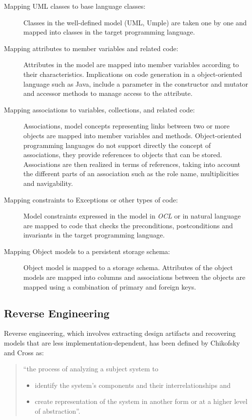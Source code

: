 \begin{description}

\item [Mapping UML classes to base language classes:]
Classes in the well-defined model (UML, Umple) are taken one by one and mapped into classes in the target programming language. 

\item [Mapping attributes to member variables and related code:]
Attributes in the model are mapped into member variables according to their characteristics. Implications on code generation in a object-oriented language such as Java, include a parameter in the constructor and mutator and accessor methods to manage access to the attribute.

\item [Mapping associations to variables, collections, and related code:]
Associations, model concepts representing links between two or more objects are mapped into member variables and methods. Object-oriented programming languages do not support directly the concept of associations, they provide references to objects that can be stored. Associations are then realized in terms of references, taking into account the different parts of an association such as the role name, multiplicities and navigability. 

\item [Mapping constraints to Exceptions or other types of code:]
Model constraints expressed in the model in \textit{OCL} or in natural language are mapped to code that checks the preconditions, postconditions and invariants in the target programming language.

\item [Mapping Object models to a persistent storage schema:]
Object model is mapped to a storage schema. Attributes of the object models are mapped into columns and associations between the objects are mapped using a combination of primary and foreign keys. 
\end{description}

\subsection{Reverse Engineering}

Reverse engineering, which involves extracting design artifacts and recovering models that are less implementation-dependent, has been defined by Chikofsky and Cross \cite{Chikofsky} as:

\begin{quote} 
``the process of analyzing a subject system to
\begin{itemize}
\item identify the system's components and their interrelationships and
\item create representation of the system in another form or at a higher level of abstraction''.
\end{itemize}
\end{quote}


